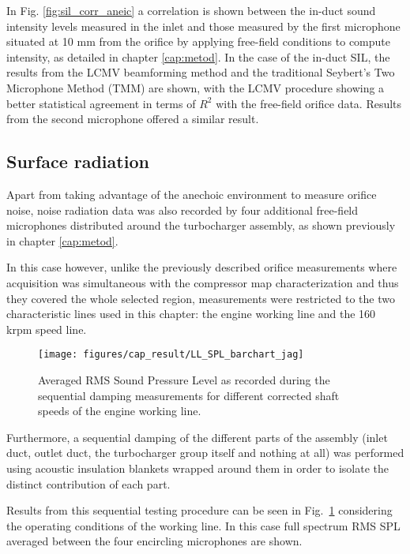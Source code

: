 In Fig. \ref{fig:sil_corr_aneic} a correlation is shown between the  in-duct sound intensity levels measured in the inlet and those measured by the first microphone situated at 10 mm from the orifice by applying free-field conditions to compute intensity, as detailed in chapter \ref{cap:metod}. In the case of the in-duct SIL, the results from the LCMV beamforming method and the traditional Seybert's \cite{seybert1988two} Two Microphone Method (TMM) are shown, with the LCMV procedure showing a better statistical agreement in terms of $R^2$ with the free-field orifice data. Results from the second microphone offered a similar result.

\subsection{Surface radiation}

Apart from taking advantage of the anechoic environment to measure orifice noise, noise radiation data was also recorded by four additional free-field microphones distributed around the turbocharger assembly, as shown previously in chapter \ref{cap:metod}.

In this case however, unlike the previously described orifice measurements where acquisition was simultaneous with the compressor map characterization and thus they covered the whole selected region, measurements were restricted to the two characteristic lines used in this chapter: the engine working line and the 160 krpm speed line.

\begin{figure}[tbh!]
\centering
\texttt{[image: figures/cap\_result/LL\_SPL\_barchart\_jag]}
\caption[Averaged radiated SPL along the working line]{Averaged RMS Sound Pressure Level as recorded during the sequential damping measurements for different corrected shaft speeds of the engine working line.}
\label{fig:result_spl_radiated_comp_bar_LL}
\end{figure}

Furthermore, a sequential damping of the different parts of the assembly (inlet duct, outlet duct, the turbocharger group itself and nothing at all) was performed using acoustic insulation blankets wrapped around them in order to isolate the distinct contribution of each part. 

Results from this sequential testing procedure can be seen in Fig.~\ref{fig:result_spl_radiated_comp_bar_LL} considering the operating conditions of the working line. In this case full spectrum RMS SPL averaged between the four encircling microphones are shown. 

